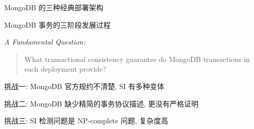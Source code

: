 
\begin{frame}{}
\end{frame}

\begin{frame}{}
  \begin{center}
	MongoDB 的三种经典部署架构
  \end{center}
\end{frame}

\begin{frame}{}
  \begin{center}
	MongoDB 事务的三阶段发展过程
  \end{center}
\end{frame}

\begin{frame}{}
  \begin{center}
	\emph{\Large A Fundamental Question:} \\[20pt]

	\begin{quote}
	  {\large What transactional consistency guarantee do MongoDB transactions
	  in each deployment provide?}
	\end{quote}
  \end{center}
\end{frame}

\begin{frame}{}
  \begin{center}
	挑战一: MongoDB 官方规约不清楚, SI 有多种变体
  \end{center}
\end{frame}

\begin{frame}{}
  \begin{center}
	挑战二: MongoDB 缺少精简的事务协议描述, 更没有严格证明
  \end{center}
\end{frame}

\begin{frame}{}
  \begin{center}
	挑战三: SI 检测问题是 \textsf{NP-complete} 问题, 复杂度高
  \end{center}
\end{frame}

